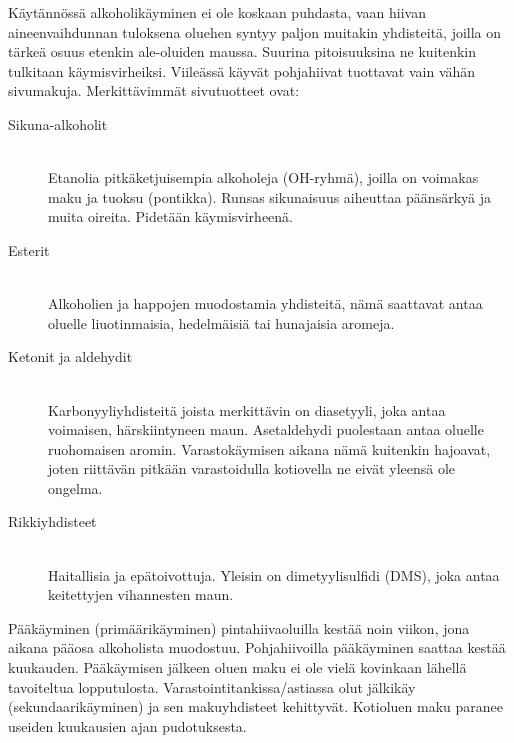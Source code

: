 \documentclass[a4paper,11pt]{report}
\begin{document}
Käytännössä alkoholikäyminen ei ole koskaan puhdasta, vaan hiivan aineenvaihdunnan tuloksena oluehen syntyy paljon muitakin yhdisteitä, joilla on tärkeä osuus etenkin ale-oluiden maussa. Suurina pitoisuuksina ne kuitenkin tulkitaan käymisvirheiksi. Viileässä käyvät pohjahiivat tuottavat vain vähän sivumakuja. Merkittävimmät sivutuotteet ovat:
\begin{description}
\item[Sikuna-alkoholit] \hfill \\
Etanolia pitkäketjuisempia alkoholeja (OH-ryhmä), joilla on voimakas maku ja tuoksu (pontikka). Runsas sikunaisuus aiheuttaa päänsärkyä ja muita oireita. Pidetään käymisvirheenä.
\item[Esterit] \hfill \\
Alkoholien ja happojen muodostamia yhdisteitä, nämä saattavat antaa oluelle liuotinmaisia, hedelmäisiä tai hunajaisia aromeja.
\item[Ketonit ja aldehydit] \hfill \\
Karbonyyliyhdisteitä joista merkittävin on diasetyyli, joka antaa voimaisen, härskiintyneen maun. Asetaldehydi puolestaan antaa oluelle ruohomaisen aromin. Varastokäymisen aikana nämä kuitenkin hajoavat, joten riittävän pitkään varastoidulla kotiovella ne eivät yleensä ole ongelma.
\item[Rikkiyhdisteet] \hfill \\
Haitallisia ja epätoivottuja. Yleisin on dimetyylisulfidi (DMS), joka antaa keitettyjen vihannesten maun.
\end{description}

Pääkäyminen (primäärikäyminen) pintahiivaoluilla kestää noin viikon, jona aikana pääosa alkoholista muodostuu. Pohjahiivoilla pääkäyminen saattaa kestää kuukauden. Pääkäymisen jälkeen oluen maku ei ole vielä kovinkaan lähellä tavoiteltua lopputulosta. Varastointitankissa/astiassa olut jälkikäy (sekundaarikäyminen) ja sen makuyhdisteet kehittyvät. Kotioluen maku paranee useiden kuukausien ajan pudotuksesta.
\end{document}
